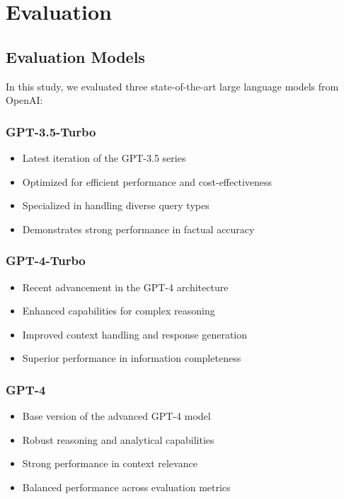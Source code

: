 \section{Evaluation}

\subsection{Evaluation Models}
In this study, we evaluated three state-of-the-art large language models from OpenAI:

\subsubsection{GPT-3.5-Turbo}
\begin{itemize}
    \item Latest iteration of the GPT-3.5 series
    \item Optimized for efficient performance and cost-effectiveness
    \item Specialized in handling diverse query types
    \item Demonstrates strong performance in factual accuracy
\end{itemize}

\subsubsection{GPT-4-Turbo}
\begin{itemize}
    \item Recent advancement in the GPT-4 architecture
    \item Enhanced capabilities for complex reasoning
    \item Improved context handling and response generation
    \item Superior performance in information completeness
\end{itemize}

\subsubsection{GPT-4}
\begin{itemize}
    \item Base version of the advanced GPT-4 model
    \item Robust reasoning and analytical capabilities
    \item Strong performance in context relevance
    \item Balanced performance across evaluation metrics
\end{itemize}

